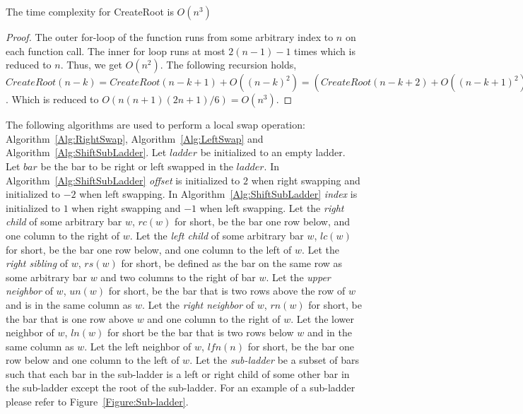 \begin{lemma}
	The time complexity for CreateRoot is $O(n^{3})$
\end{lemma}
\begin{proof}
	The outer for-loop of the function runs from some arbitrary index to $n$ on each function call. The inner for loop runs at most 
	$2(n-1)-1$ times which is reduced to $n$. Thus, we get $O(n^{2})$. The following 
	recursion holds, $CreateRoot(n-k) = CreateRoot(n-k+1) + O((n-k)^{2})=(CreateRoot(n-k+2) + O((n-k+1)^{2})) + O((n-k)^{2})\dots $. Which is 
	reduced to $O(n(n+1)(2n+1)/6) = O(n^3)$.
\end{proof}
\pagebreak
The following algorithms are used to perform a local swap operation: Algorithm~\ref{Alg:RightSwap}, Algorithm~\ref{Alg:LeftSwap} and Algorithm~\ref{Alg:ShiftSubLadder}.
Let $ladder$ be initialized to an empty ladder. Let $bar$ be the bar to be right or left swapped in the $ladder$.
In Algorithm~\ref{Alg:ShiftSubLadder} \textit{offset} is initialized to $2$ when right swapping and initialized to 
$-2$ when left swapping. In Algorithm~\ref{Alg:ShiftSubLadder} \textit{index} is initialized to $1$ when 
right swapping and $-1$ when left swapping.
Let the \emph{right child} of some arbitrary bar $w$, $rc(w)$ for short, be the bar one row below, and one column to the 
right of $w$. Let the \emph{left child} of some arbitrary bar $w$, $lc(w)$ for short, be the bar one 
row below, and one column to the left of $w$. 
Let the \emph{right sibling} of $w$, $rs(w)$ for short,  be defined as the bar on the same row as some arbitrary bar $w$ and
two columns to the right of bar $w$. 
Let the \emph{upper neighbor} of $w$, $un(w)$ for short, be the bar that is two rows above the row of $w$ and is 
in the same column as $w$. Let the \emph{right neighbor} of $w$, $rn(w)$ for short, be the bar that is one row 
above $w$ and one column to the right of $w$. Let the lower neighbor of $w$, $ln(w)$ for short be 
the bar that is two rows below $w$ and in the same column as $w$. Let the left neighbor of 
$w$, $lfn(n)$ for short, be the bar one row below and one column to the left of $w$.
Let the \emph{sub-ladder} be a subset of bars such that each bar in the sub-ladder is a left or right child 
of some other bar in the sub-ladder except the root of the sub-ladder. For an example of a sub-ladder please refer to 
Figure~\ref{Figure:Sub-ladder}.
